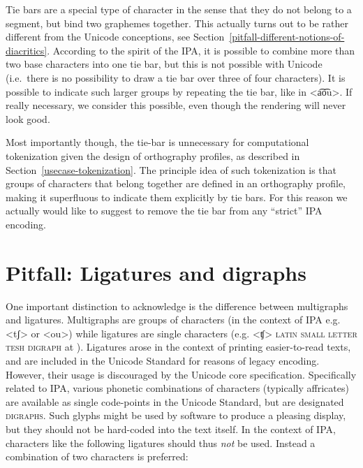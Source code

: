 Tie bars are a special type of character in the sense that they do not belong to
a segment, but bind two graphemes together. This actually turns out to be rather
different from the Unicode conceptions, see
Section~\ref{pitfall-different-notions-of-diacritics}. According to the spirit
of the IPA, it is possible to combine more than two base characters into one tie
bar, but this is not possible with Unicode (i.e.~there is no possibility to draw
a tie bar over three of four characters). It is possible to indicate such larger
groups by repeating the tie bar, like in <a͡o͡u>. If really necessary, we
consider this possible, even though the rendering will never look good. 

Most importantly though, the tie-bar is unnecessary for computational
tokenization given the design of orthography profiles, as described in
Section~\ref{usecase-tokenization}. The principle idea of such tokenization is 
that groups of characters that belong together are defined in an orthography 
profile, making it superfluous to indicate them explicitly by tie bars. For this 
reason we actually would like to suggest to remove the tie bar from any 
``strict'' IPA encoding.

\section{Pitfall: Ligatures and digraphs}
\label{pitfall-ligatures-digraphs}     

One important distinction to acknowledge is the difference between multigraphs
and ligatures. Multigraphs are groups of characters (in the context of IPA e.g.
<tʃ> or <ou>) while ligatures are single characters (e.g. <ʧ> \textsc{latin
small letter tesh digraph} at ). Ligatures arose in the context of
printing easier-to-read texts, and are included in the Unicode Standard for
reasons of legacy encoding. However, their usage is discouraged by the Unicode
core specification. Specifically related to IPA, various phonetic combinations
of characters (typically affricates) are available as single code-points in the
Unicode Standard, but are designated \textsc{digraphs}. Such glyphs might be used by
software to produce a pleasing display, but they should not be hard-coded into
the text itself. In the context of IPA, characters like the following ligatures
should thus \emph{not} be used. Instead a combination of two characters is
preferred:
      
